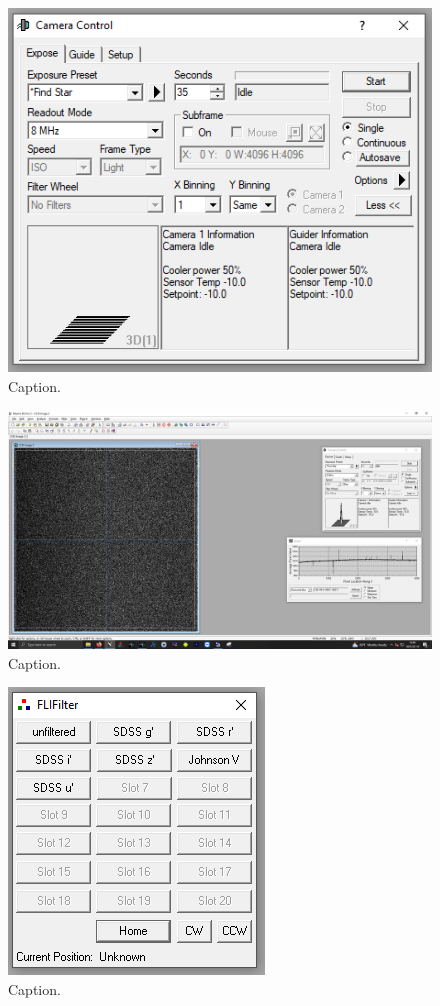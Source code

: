 \documentclass{article}
\begin{document}
	\begin{figure}[htbp!]
		\centering
		\includegraphics[scale=0.75]{images/maxim-5.png}
		\caption{Caption.}
		\label{fig:maxim-5}
	\end{figure}
	
	\begin{figure}[htbp!]
		\centering
		\includegraphics[scale=0.25]{images/maxim-6.png}
		\caption{Caption.}
		\label{fig:maxim-6}
	\end{figure}
	
	\begin{figure}[htbp!]
		\centering
		\includegraphics[scale=1]{images/flifilter-1.png}
		\caption{Caption.}
		\label{fig:flifilter-1}
	\end{figure}
	
\end{document}
